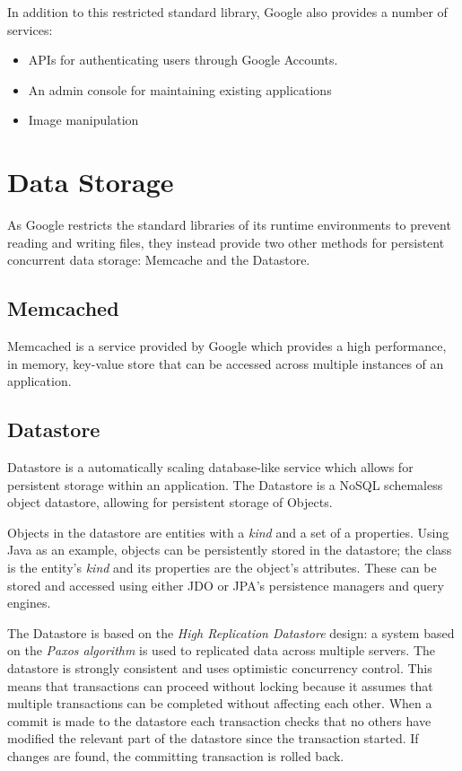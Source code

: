 In addition to this restricted standard library, Google also provides a number of services:
\begin{itemize}
\item APIs for authenticating users through Google Accounts.
\item An admin console for maintaining existing applications
\item Image manipulation
\end{itemize}

\section{Data Storage}
As Google restricts the standard libraries of its runtime environments to prevent reading and writing files, they instead provide two other methods for persistent concurrent data storage: Memcache and the Datastore.

\subsection{Memcached}
Memcached is a service provided by Google which provides a high performance, in memory, key-value store that can be accessed across multiple instances of an application\ftGAETwo. 

\subsection{Datastore}
Datastore is a automatically scaling database-like service which allows for persistent storage within an application. The Datastore is a NoSQL schemaless object datastore, allowing for persistent storage of Objects. 

Objects in the datastore are entities with a \emph{kind} and a set of a properties. Using Java as an example, objects can be persistently stored in the datastore; the class is the entity's \emph{kind} and its properties are the object's attributes. These can be stored and accessed using either JDO or JPA's persistence managers and query engines\ftGAETwo.

The Datastore is based on the \emph{High Replication Datastore} design: a system based on the \emph{Paxos algorithm} is used to replicated data across multiple servers. The datastore is strongly consistent and uses optimistic concurrency control\ftGAEThree. This means that transactions can proceed without locking because it assumes that multiple transactions can be completed without affecting each other. When a commit is made to the datastore each transaction checks that no others have modified the relevant part of the datastore since the transaction started. If changes are found, the committing transaction is rolled back\ftGAEFour.\ftGAEThreeText\ftGAEFourText
 

